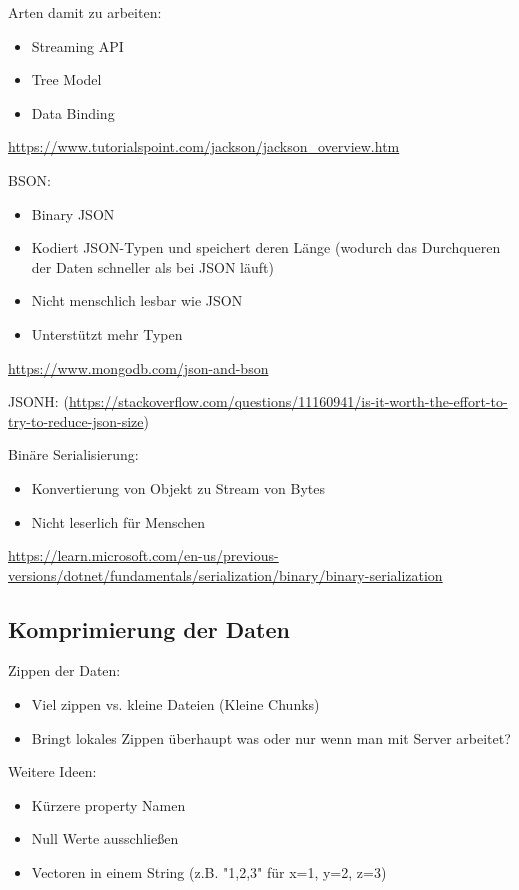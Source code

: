 Arten damit zu arbeiten:
\begin{itemize}
    \item Streaming API
    \item Tree Model
    \item Data Binding
\end{itemize}
\url{https://www.tutorialspoint.com/jackson/jackson_overview.htm}

BSON:
\begin{itemize}
    \item Binary JSON
    \item Kodiert JSON-Typen und speichert deren Länge (wodurch das Durchqueren der Daten schneller als bei JSON läuft)
    \item Nicht menschlich lesbar wie JSON
    \item Unterstützt mehr Typen
\end{itemize}
\url{https://www.mongodb.com/json-and-bson}

JSONH: (\url{https://stackoverflow.com/questions/11160941/is-it-worth-the-effort-to-try-to-reduce-json-size})



Binäre Serialisierung:
\begin{itemize}
    \item Konvertierung von Objekt zu Stream von Bytes
    \item Nicht leserlich für Menschen
\end{itemize}
\url{https://learn.microsoft.com/en-us/previous-versions/dotnet/fundamentals/serialization/binary/binary-serialization}


\subsection{Komprimierung der Daten}
Zippen der Daten:
\begin{itemize}
    \item Viel zippen vs. kleine Dateien (Kleine Chunks)
    \item Bringt lokales Zippen überhaupt was oder nur wenn man mit Server arbeitet?
\end{itemize}

Weitere Ideen:
\begin{itemize}
    \item Kürzere property Namen
    \item Null Werte ausschließen
    \item Vectoren in einem String (z.B. "1,2,3" für x=1, y=2, z=3)
\end{itemize}


